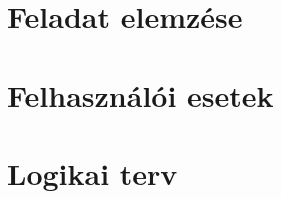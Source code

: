 \documentclass[11pt, a4paper]{article}
\begin{document}
\tableofcontents




\section{Feladat elemzése}


\section{Felhasználói esetek}


\section{Logikai terv}

\end{document}
